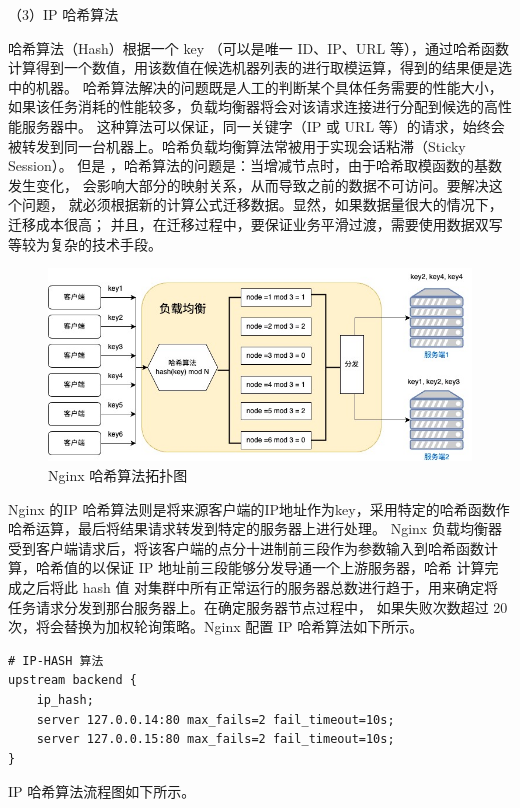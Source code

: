 （3）IP 哈希算法

哈希算法（Hash）根据一个 key （可以是唯一 ID、IP、URL 等），通过哈希函数计算得到一个数值，用该数值在候选机器列表的进行取模运算，得到的结果便是选中的机器\cite{邱亚飞2021哈希算法的实现与验证}。
哈希算法解决的问题既是人工的判断某个具体任务需要的性能大小，如果该任务消耗的性能较多，负载均衡器将会对该请求连接进行分配到候选的高性能服务器中。
这种算法可以保证，同一关键字（IP 或 URL 等）的请求，始终会被转发到同一台机器上。哈希负载均衡算法常被用于实现会话粘滞（Sticky Session）。
但是 ，哈希算法的问题是：当增减节点时，由于哈希取模函数的基数发生变化，
会影响大部分的映射关系，从而导致之前的数据不可访问。要解决这个问题，
就必须根据新的计算公式迁移数据。显然，如果数据量很大的情况下，迁移成本很高；
并且，在迁移过程中，要保证业务平滑过渡，需要使用数据双写等较为复杂的技术手段。

\begin{figure}[htb]
  \centering
  \includegraphics[width=\textwidth]{figures/hash-algo.jpg}
  \caption{Nginx 哈希算法拓扑图}
\end{figure}

Nginx 的IP 哈希算法则是将来源客户端的IP地址作为key，采用特定的哈希函数作哈希运算，最后将结果请求转发到特定的服务器上进行处理。
Nginx 负载均衡器受到客户端请求后，将该客户端的点分十进制前三段作为参数输入到哈希函数计算，哈希值的以保证 IP 地址前三段能够分发导通一个上游服务器，哈希
计算完成之后将此 hash 值 对集群中所有正常运行的服务器总数进行趋于，用来确定将任务请求分发到那台服务器上。在确定服务器节点过程中，
如果失败次数超过 20 次，将会替换为加权轮询策略。Nginx 配置 IP 哈希算法如下所示。

\begin{lstlisting}
# IP-HASH 算法
upstream backend {
    ip_hash;
    server 127.0.0.14:80 max_fails=2 fail_timeout=10s;
    server 127.0.0.15:80 max_fails=2 fail_timeout=10s;
}
\end{lstlisting}

IP 哈希算法流程图如下所示。

